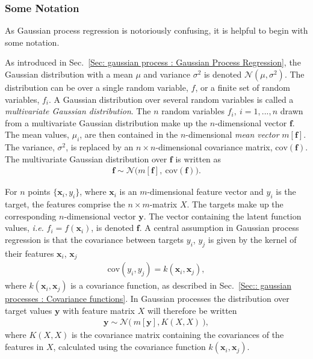 \documentclass[twoside,english]{uiofysmaster}
\begin{document}
{{\subsubsection{Some Notation}

As Gaussian process regression is notoriously confusing, it is helpful to begin with some notation. 

As introduced in Sec.~\ref{Sec: gaussian process : Gaussian Process Regression}, the Gaussian distribution with a mean $\mu$ and variance $\sigma^2$ is denoted $\mathcal{N}(\mu, \sigma^2)$. The distribution can be over a single random variable, $f$, or a finite set of random variables, $f_i$. A Gaussian distribution over several random variables is called a \textit{multivariate Gaussian distribution}. The $n$ random variables $f_i, ~i=1,...,n$ drawn from a multivariate Gaussian distribution make up the $n$-dimensional vector $\textbf{f}$. The mean values, $\mu_i$, are then contained in the $n$-dimensional \textit{mean vector} $m[\textbf{f}]$. The variance, $\sigma^2$, is replaced by an $n \times n$-dimensional covariance matrix, $\text{cov}(\textbf{f})$. The multivariate Gaussian distribution over $\textbf{f}$ is written as
\begin{align}
\textbf{f} \sim \mathcal{N} \big(m[\textbf{f}], ~\text{cov}(\textbf{f})  \big).
\end{align}  

For $n$ points $\{\textbf{x}_i , y_i\}$, where $\textbf{x}_i$ is an $m$-dimensional feature vector and $y_i$ is the target, the features comprise the $n \times m$-matrix $X$. The targets make up the corresponding $n$-dimensional vector $\textbf{y}$. The vector containing the latent function values, \textit{i.e.} $f_i = f(\textbf{x}_i)$, is denoted $\textbf{f}$. A central assumption in Gaussian process regression is that the covariance between targets $y_i$, $y_j$ is given by the kernel of their features $\textbf{x}_i$, $\textbf{x}_j$
\begin{align}\label{Eq:: gaussian process : cov(y) gaussian process}
\text{cov}(y_i, y_j) = k(\textbf{x}_i, \textbf{x}_j),
\end{align}
where $k(\textbf{x}_i, \textbf{x}_j)$ is a covariance function, as described in Sec.~\ref{Sec:: gaussian processes : Covariance functions}. In Gaussian processes the distribution over target values $\textbf{y}$ with feature matrix $X$ will therefore be written
\begin{align}\label{Eq:: gaussian process : Normal distribution GP}
\textbf{y} \sim \mathcal{N} \big(~m[ \textbf{y} ], K(X, X) ~\big),
\end{align}
where $K(X,X)$ is the covariance matrix containing the covariances of the features in $X$, calculated using the covariance function $k(\textbf{x}_i, \textbf{x}_j)$.

}}
\end{document}
